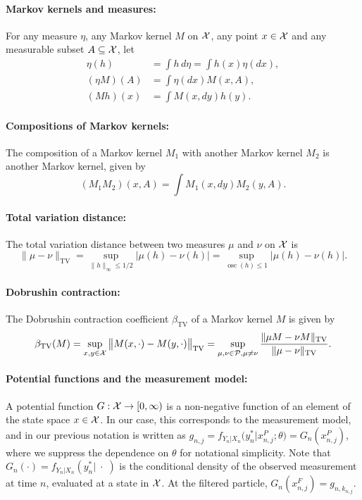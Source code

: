 \documentclass[11pt]{article}
\theoremstyle{thmstylethree}%
\begin{document}
\paragraph{\bf Markov kernels and measures:} For any measure $\eta$, any Markov kernel $M$ on ${\mathcal{X}}$, any point $x \in {\mathcal{X}}$ and any measurable subset $A \subseteq {\mathcal{X}}$, let 
\begin{align}
    \eta(h) &= \int h \, d\eta = \int h(x) \eta(dx), \\(\eta M)(A) &= \int \eta(dx)M(x,A), \\
    (Mh)(x) &= \int M(x, dy) h(y).
\end{align}

\paragraph{\bf Compositions of Markov kernels:} The composition of a Markov kernel $M_1$ with another Markov kernel $M_2$ is another Markov kernel, given by 
\begin{equation}
 (M_1M_2)(x, A) = \int M_1(x, dy) M_2(y, A).
\end{equation}

\paragraph{\bf Total variation distance:} The total variation distance between two measures $\mu$ and $\nu$ on ${\mathcal{X}}$ is
\begin{equation}
\|\mu-\nu\|_{\mathrm{TV}}=\sup _{\|h\|_{\infty} \leq 1 / 2}|\mu(h)-\nu(h)|=\sup _{\operatorname{osc}(h) \leq 1}|\mu(h)-\nu(h)|.    
\end{equation}

\paragraph{\bf Dobrushin contraction:} The Dobrushin contraction coefficient $\beta_{\text{TV}}$ of a Markov kernel $M$ is given by
\begin{equation}
\beta_{\mathrm{TV}}(M)=\sup _{x, y \in {\mathcal{X}}}\big\|M(x, \cdot)-M(y, \cdot)\big\|_{\mathrm{TV}}=\sup _{\mu, \nu \in \mathcal{P}, \mu \neq \nu} \frac{\|\mu M-\nu M\|_{\mathrm{TV}}}{\|\mu-\nu\|_{\mathrm{TV}}}.    
\end{equation}

\paragraph{\bf Potential functions and the measurement model:} A potential function $G : {\mathcal{X}} \to [0,\infty)$ is a non-negative function of an element of the state space $x \in {\mathcal{X}}$. 
In our case, this corresponds to the measurement model, and in our previous notation is written as $g_{n,j} = f_{Y_n|X_n}\big(y_n^*|x_{n,j}^P;\theta\big) = G_n(x_{n,j}^P)$, where we suppress the dependence on $\theta$ for notational simplicity.
Note that $G_n(\cdot) = f_{Y_n|X_n}(y_n^*|\;\cdot\;)$ is the conditional density of the observed measurement at time $n$, evaluated at a state in ${\mathcal{X}}$. At the filtered particle,
$G_n(x_{n,j}^F)=g_{n,k_{n,j}}$.
\end{document}
